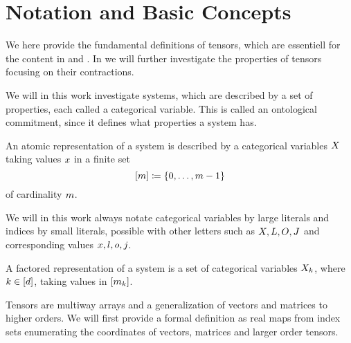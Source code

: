 \chapter{Notation and Basic Concepts}\label{cha:TensorNetworks}\label{cha:notation}

We here provide the fundamental definitions of tensors, which are essentiell for the content in  and .
In  we will further investigate the properties of tensors focusing on their contractions.


We will in this work investigate systems, which are described by a set of properties, each called a categorical variable.
This is called an ontological commitment, since it defines what properties a system has.

\begin{definition}
	An atomic representation of a system is described by a categorical variables $X$ taking values $x$ in a finite set
		\[  [m]\coloneqq \{0,\ldots, m-1\} \]
	of cardinality $m$.
\end{definition}

We will in this work always notate categorical variables by large literals and indices by small literals, possible with other letters such as $X,L,O,J$ and corresponding values $x,l,o,j$.

\begin{definition}
	A factored representation of a system is a set of categorical variables $X_{k}$, where $k\in[d]$, taking values in $[m_{k}]$.
\end{definition}


Tensors are multiway arrays and a generalization of vectors and matrices to higher orders.
We will first provide a formal definition as real maps from index sets enumerating the coordinates of vectors, matrices and larger order tensors.

